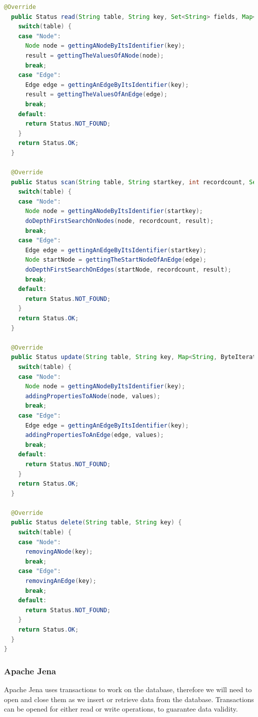\begin{lstlisting}[language={Java},label={lst:databaseTemplate},caption={Generic example of a database implementation with the use of graph data.}]
  @Override
  public Status read(String table, String key, Set<String> fields, Map<String, ByteIterator> result) {
    switch(table) {
    case "Node":
      Node node = gettingANodeByItsIdentifier(key);
      result = gettingTheValuesOfANode(node);
      break;
    case "Edge":
      Edge edge = gettingAnEdgeByItsIdentifier(key);
      result = gettingTheValuesOfAnEdge(edge);
      break;
    default:
      return Status.NOT_FOUND;
    }
    return Status.OK;
  }

  @Override
  public Status scan(String table, String startkey, int recordcount, Set<String> fields, Vector<HashMap<String, ByteIterator>> result) {
    switch(table) {
    case "Node":
      Node node = gettingANodeByItsIdentifier(startkey);
      doDepthFirstSearchOnNodes(node, recordcount, result);
      break;
    case "Edge":
      Edge edge = gettingAnEdgeByItsIdentifier(startkey);
      Node startNode = gettingTheStartNodeOfAnEdge(edge);
      doDepthFirstSearchOnEdges(startNode, recordcount, result);
      break;
    default:
      return Status.NOT_FOUND;
    }
    return Status.OK;
  }

  @Override
  public Status update(String table, String key, Map<String, ByteIterator> values) {
    switch(table) {
    case "Node":
      Node node = gettingANodeByItsIdentifier(key);
      addingPropertiesToANode(node, values);
      break;
    case "Edge":
      Edge edge = gettingAnEdgeByItsIdentifier(key);
      addingPropertiesToAnEdge(edge, values);
      break;
    default:
      return Status.NOT_FOUND;
    }
    return Status.OK;
  }

  @Override
  public Status delete(String table, String key) {
    switch(table) {
    case "Node":
      removingANode(key);
      break;
    case "Edge":
      removingAnEdge(key);
      break;
    default:
      return Status.NOT_FOUND;
    }
    return Status.OK;
  }
}
\end{lstlisting}




\subsubsection{Apache Jena}
Apache Jena uses transactions to work on the database,
therefore we will need to open and close them as we insert or retrieve data from the database.
Transactions can be opened for either read or write operations,
to guarantee data validity.

